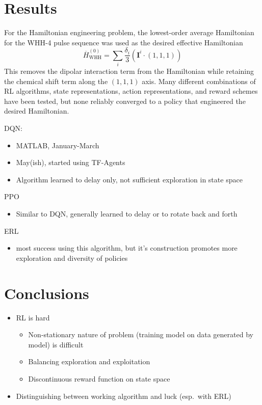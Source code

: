\documentclass[twocolumn, aps, 10pt]{revtex4-2}
\begin{document}
\section{Results}

For the Hamiltonian engineering problem, the lowest-order average Hamiltonian for the WHH-4 pulse sequence was used as the desired effective Hamiltonian
\begin{equation}
    \overline{H}_\text{WHH}^{(0)} = \sum_i
        \frac{\delta_i}{3} \left( \mathbf{I}^i \cdot (1,1,1) \right)
\end{equation}
This removes the dipolar interaction term from the Hamiltonian while retaining the chemical shift term along the $(1,1,1)$ axis.
Many different combinations of RL algorithms, state representations, action representations, and reward schemes have been tested, but none reliably converged to a policy that engineered the desired Hamiltonian.


DQN:
\begin{itemize}
\item MATLAB, January-March
\item May(ish), started using TF-Agents
\item Algorithm learned to delay only, not sufficient exploration in state
  space
\end{itemize}

PPO
\begin{itemize}
\item Similar to DQN, generally learned to delay or to rotate back and forth
\end{itemize}

ERL
\begin{itemize}
\item most success using this algorithm, but it's construction promotes more
  exploration and diversity of policies
\end{itemize}

\section{Conclusions}


\begin{itemize}

\item RL is hard

  \begin{itemize}
  
  \item Non-stationary nature of problem (training model on data generated
    by model) is difficult
  \item Balancing exploration and exploitation
  \item Discontinuous reward function on state space
  \end{itemize}
\item Distinguishing between working algorithm and luck (esp.~with ERL)
\end{itemize}
\end{document}
